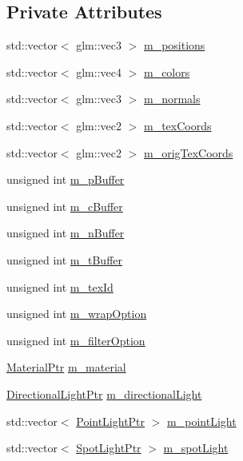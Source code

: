 \subsection*{Private Attributes}
\begin{DoxyCompactItemize}
\item 
std\+::vector$<$ glm\+::vec3 $>$ \hyperlink{classTexturedPlaneRenderable_ac430deef6c1dca1d5b2833ca70550ad0}{m\+\_\+positions}
\item 
std\+::vector$<$ glm\+::vec4 $>$ \hyperlink{classTexturedPlaneRenderable_a142bff7d6aa370cfd227823433c87f2b}{m\+\_\+colors}
\item 
std\+::vector$<$ glm\+::vec3 $>$ \hyperlink{classTexturedPlaneRenderable_a3a73b60c00a58775e7ca5ebfc127ab49}{m\+\_\+normals}
\item 
std\+::vector$<$ glm\+::vec2 $>$ \hyperlink{classTexturedPlaneRenderable_adcb8aeecb13c5476b2a3397b9c3526a0}{m\+\_\+tex\+Coords}
\item 
std\+::vector$<$ glm\+::vec2 $>$ \hyperlink{classTexturedPlaneRenderable_afca722b8eb986dc3fdf7ec22d34c3b0e}{m\+\_\+orig\+Tex\+Coords}
\item 
unsigned int \hyperlink{classTexturedPlaneRenderable_a85ab7e27c7cb5f3d3adc77bc30396079}{m\+\_\+p\+Buffer}
\item 
unsigned int \hyperlink{classTexturedPlaneRenderable_adaacaeab232fe85b6c8471f2072fcb97}{m\+\_\+c\+Buffer}
\item 
unsigned int \hyperlink{classTexturedPlaneRenderable_a89a488243e2ed9ef1921c6312324f997}{m\+\_\+n\+Buffer}
\item 
unsigned int \hyperlink{classTexturedPlaneRenderable_a1fd262eba65ec9a2ef8fffb3fdf12df9}{m\+\_\+t\+Buffer}
\item 
unsigned int \hyperlink{classTexturedPlaneRenderable_af6121c56a3d712bfc2b1c39b5365c6b0}{m\+\_\+tex\+Id}
\item 
unsigned int \hyperlink{classTexturedPlaneRenderable_a13d8d7a33df910210f1eb31d91d5785d}{m\+\_\+wrap\+Option}
\item 
unsigned int \hyperlink{classTexturedPlaneRenderable_ac13cc677745b31dc2046fc31c9ef61f1}{m\+\_\+filter\+Option}
\item 
\hyperlink{Material_8hpp_a1d47cd05ca683e287435cf0b363fbfe1}{Material\+Ptr} \hyperlink{classTexturedPlaneRenderable_a85a94f1ce193e81aca7a01fd87f63069}{m\+\_\+material}
\item 
\hyperlink{Light_8hpp_ad8ef93288a101a8d8f185fb2a88f496d}{Directional\+Light\+Ptr} \hyperlink{classTexturedPlaneRenderable_a3a78ad4ace1c94c1d12969a19fabbe5d}{m\+\_\+directional\+Light}
\item 
std\+::vector$<$ \hyperlink{Light_8hpp_a28898b9799350669037caef13c5115d2}{Point\+Light\+Ptr} $>$ \hyperlink{classTexturedPlaneRenderable_a71ac9074c2e6cf30f732e56644c79354}{m\+\_\+point\+Light}
\item 
std\+::vector$<$ \hyperlink{Light_8hpp_a1865f598c5eed6e6e1f79d7296852092}{Spot\+Light\+Ptr} $>$ \hyperlink{classTexturedPlaneRenderable_a38bc9b9ecb9d086076bade1753e36295}{m\+\_\+spot\+Light}
\end{DoxyCompactItemize}
